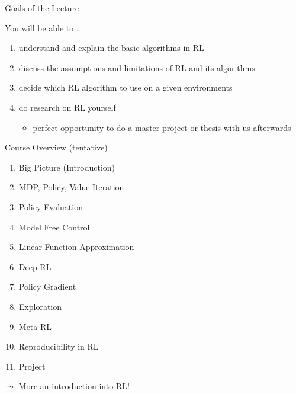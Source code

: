 \documentclass[aspectratio=169]{../latex_main/tntbeamer}  %
\begin{document}
\begin{frame}[c]{Goals of the Lecture}
	
	You will be able to \ldots
	\begin{enumerate}
		\item understand and explain the basic algorithms in RL
		\smallskip
		\item discuss the assumptions and limitations of RL and its algorithms
		\smallskip
		\item decide which RL algorithm to use on a given environments
		\smallskip
		\item do research on RL yourself
		\begin{itemize}
			\item perfect opportunity to do a master project or thesis with us afterwards
		\end{itemize}
	\end{enumerate}
	
\end{frame}
\begin{frame}[c]{Course Overview (tentative)}
	
	\begin{enumerate}
		\item Big Picture (Introduction)
		\item MDP, Policy, Value Iteration
		\item Policy Evaluation
		\item Model Free Control
		\item Linear Function Approximation
		\item Deep RL
		\item Policy Gradient
		\item Exploration
		\item Meta-RL
		\item Reproducibility in RL
		\item Project
	\end{enumerate}
	
	\pause
	$\leadsto$ More an introduction into RL!
	
\end{frame}
\end{document}

